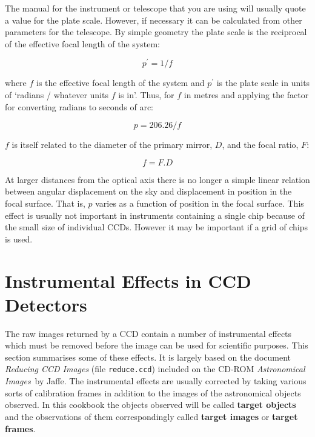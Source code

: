 \documentclass[twoside,11pt]{article}
\newcommand{\xlabel}[1]{}
\begin{document}
The manual for the instrument or telescope that you are using will usually
quote a value for the plate scale.  However, if necessary it can be
calculated from other parameters for the telescope.  By simple geometry
the plate scale is the reciprocal of the effective focal length of the
system:

\begin{equation}
p^{\prime} = 1 / f
\end{equation}

where $f$ is the effective focal length of the system and $p^{\prime}$ is the
plate scale in units of `radians / whatever units $f$ is in'.  Thus, for
$f$ in metres and applying the factor for converting radians to seconds
of arc:

\begin{equation}
p = 206.26 / f
\end{equation}

$f$ is itself related to the diameter of the primary mirror, $D$, and
the focal ratio, $F$:

\begin{equation}
f = F . D
\end{equation}

At larger distances from the optical axis there is no longer a simple
linear relation between angular displacement on the sky and displacement
in position in the focal surface.  That is, $p$ varies as a function of
position in the focal surface.  This effect is usually not important
in instruments containing a single chip because of the small size of
individual CCDs.  However it may be important if a grid of chips is used.


\section{\xlabel{EASY}\label{EASY}Instrumental Effects in CCD Detectors}

The raw images returned by a CCD contain a number of instrumental
effects which must be removed before the image can be used for scientific
purposes.  This section summarises some of these effects.  It is largely
based on the document {\it Reducing CCD Images}\/ (file {\tt reduce.ccd})
included on the CD-ROM {\it Astronomical Images}\, by Jaffe\cite{JAFFE98}.
The instrumental effects are usually corrected by taking various sorts
of calibration frames in addition to the images of the astronomical objects
observed.  In this cookbook the objects observed will be called {\bf
target objects} and the observations of them correspondingly called {\bf
target images} or {\bf target frames}.
\end{document}
